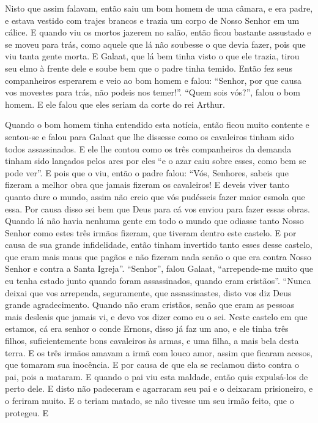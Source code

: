 Nisto que assim falavam, então saiu um bom homem de uma câmara, e era padre, e
estava vestido com trajes brancos e trazia um corpo de Nosso Senhor em um
cálice. E quando viu os mortos jazerem no salão, então ficou bastante assustado
e se moveu para trás, como aquele que lá não soubesse o que devia fazer, pois
que viu tanta gente morta. E Galaat, que lá bem tinha visto o que ele trazia,
tirou seu elmo à frente dele e soube bem que o padre tinha temido. Então fez
seus companheiros esperarem e veio ao bom homem e falou: “Senhor, por que causa
vos movestes para trás, não podeis nos temer!”. “Quem sois vós?”, falou o bom
homem. E ele falou que eles seriam da corte do rei Arthur.  

Quando o bom homem tinha entendido esta notícia, então ficou muito contente e
sentou-se e falou para Galaat que lhe dissesse como os cavaleiros tinham sido
todos assassinados. E ele lhe contou como os três companheiros da demanda
tinham sido lançados pelos ares por eles “e o azar caiu sobre esses, como bem
se pode ver”. E pois que o viu, então o padre falou: “Vós, Senhores, sabeis que
fizeram a melhor obra que jamais fizeram os cavaleiros! E deveis viver tanto
quanto dure o mundo, assim não creio que vós pudésseis fazer maior esmola que
essa. Por causa disso sei bem que Deus para cá vos enviou para fazer essas
obras. Quando lá não havia nenhuma gente em todo o mundo que odiasse tanto
Nosso Senhor como estes três irmãos fizeram, que tiveram dentro este castelo. E
por causa de sua grande infidelidade, então tinham invertido tanto esses desse
castelo, que eram mais maus que pagãos e não fizeram nada senão o que era
contra Nosso Senhor e contra a Santa Igreja”. “Senhor”, falou Galaat,
“arrepende-me muito que eu tenha estado junto quando foram assassinados, quando
eram cristãos”. “Nunca deixai que vos arrependa, seguramente, que
assassinastes, disto vos diz Deus grande agradecimento. Quando não eram
cristãos, senão que eram as pessoas mais desleais que jamais vi, e devo vos
dizer como eu o sei. Neste castelo em que estamos, cá era senhor o conde
Ernons, disso já faz um ano, e ele tinha três filhos, suficientemente bons
cavaleiros às armas, e uma filha, a mais bela desta terra. E os três irmãos
amavam a irmã com louco amor, assim que ficaram acesos, que tomaram sua
inocência. E por causa de que ela se reclamou disto contra o pai, pois a
mataram. E quando o pai viu esta maldade, então quis expulsá-los de perto dele.
E disto não padeceram e agarraram seu pai e o deixaram prisioneiro, e o feriram
muito. E o teriam matado, se não tivesse um seu irmão feito, que o protegeu. E
